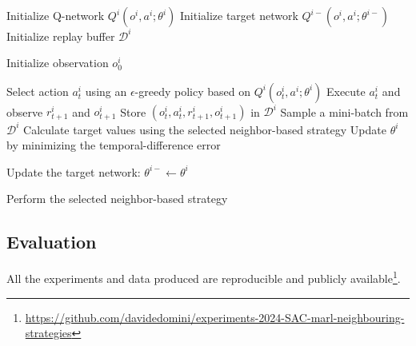 \begin{algorithm}[h]
    \caption{Neighbor-Based Deep Q-Learning}
    \label{alg:neighbor_dqn}

    \begin{algorithmic}[1]
            \State Initialize Q-network
                $Q^i(o^i, a^i; \theta^i)$
            \State Initialize target network
                $Q^{i-}(o^i, a^i; \theta^{i-})$
            \State Initialize replay buffer $\mathcal{D}^i$
        \EndFor

                \State Initialize observation $o_0^i$
            \EndFor

                    \State Select action $a_t^i$ using an
                        $\epsilon$-greedy policy based on
                        $Q^i(o_t^i, a^i; \theta^i)$
                    \State Execute $a_t^i$ and observe
                        $r_{t+1}^i$ and $o_{t+1}^i$
                    \State Store
                        $(o_t^i, a_t^i, r_{t+1}^i, o_{t+1}^i)$
                        in $\mathcal{D}^i$
                    \State Sample a mini-batch from $\mathcal{D}^i$
                    \State Calculate target values using the selected
                        neighbor-based strategy
                    \State Update $\theta^i$ by minimizing the
                        temporal-difference error

                        \State Update the target network:
                            $\theta^{i-} \gets \theta^i$
                    \EndIf

                        \State Perform the selected neighbor-based strategy
                    \EndIf
                \EndFor
            \EndFor
        \EndFor
    \end{algorithmic}
\end{algorithm}

\subsection{Evaluation}
All the experiments and data produced are reproducible 
 and publicly available\footnote{\url{https://github.com/davidedomini/experiments-2024-SAC-marl-neighbouring-strategies}}.

